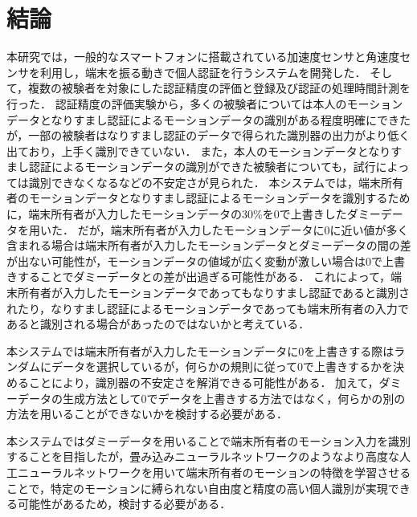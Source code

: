 \chapter{結論}
本研究では，一般的なスマートフォンに搭載されている加速度センサと角速度センサを利用し，端末を振る動きで個人認証を行うシステムを開発した．
そして，複数の被験者を対象にした認証精度の評価と登録及び認証の処理時間計測を行った．
認証精度の評価実験から，多くの被験者については本人のモーションデータとなりすまし認証によるモーションデータの識別がある程度明確にできたが，一部の被験者はなりすまし認証のデータで得られた識別器の出力がより低く出ており，上手く識別できていない．
また，本人のモーションデータとなりすまし認証によるモーションデータの識別ができた被験者についても，試行によっては識別できなくなるなどの不安定さが見られた．
本システムでは，端末所有者のモーションデータとなりすまし認証によるモーションデータを識別するために，端末所有者が入力したモーションデータの30\%を0で上書きしたダミーデータを用いた．
だが，端末所有者が入力したモーションデータに0に近い値が多く含まれる場合は端末所有者が入力したモーションデータとダミーデータの間の差が出ない可能性が，モーションデータの値域が広く変動が激しい場合は0で上書きすることでダミーデータとの差が出過ぎる可能性がある．
これによって，端末所有者が入力したモーションデータであってもなりすまし認証であると識別されたり，なりすまし認証によるモーションデータであっても端末所有者の入力であると識別される場合があったのではないかと考えている．

本システムでは端末所有者が入力したモーションデータに0を上書きする際はランダムにデータを選択しているが，何らかの規則に従って0で上書きするかを決めることにより，識別器の不安定さを解消できる可能性がある．
加えて，ダミーデータの生成方法として0でデータを上書きする方法ではなく，何らかの別の方法を用いることができないかを検討する必要がある．

本システムではダミーデータを用いることで端末所有者のモーション入力を識別することを目指したが，畳み込みニューラルネットワークのようなより高度な人工ニューラルネットワークを用いて端末所有者のモーションの特徴を学習させることで，特定のモーションに縛られない自由度と精度の高い個人識別が実現できる可能性があるため，検討する必要がある．
